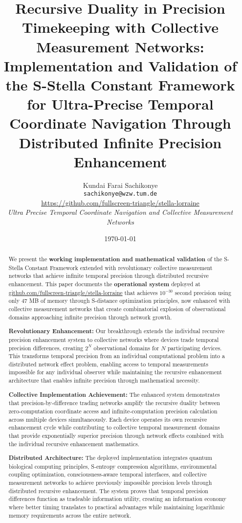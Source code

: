 \documentclass[12pt,a4paper]{article}
\title{Recursive Duality in Precision Timekeeping with Collective Measurement Networks: \\Implementation and Validation of the S-Stella Constant Framework \\for Ultra-Precise Temporal Coordinate Navigation Through \\Distributed Infinite Precision Enhancement}
\author{Kundai Farai Sachikonye\\
\texttt{sachikonye@wzw.tum.de}\\
\href{https://github.com/fullscreen-triangle/stella-lorraine}{https://github.com/fullscreen-triangle/stella-lorraine}\\
\textit{Ultra Precise Temporal Coordinate Navigation and Collective Measurement Networks}}
\date{\today}
\begin{document}
\maketitle

\begin{abstract}
We present the \textbf{working implementation and mathematical validation} of the S-Stella Constant Framework extended with revolutionary collective measurement networks that achieve infinite temporal precision through distributed recursive enhancement. This paper documents the \textbf{operational system} deployed at \href{https://github.com/fullscreen-triangle/stella-lorraine}{github.com/fullscreen-triangle/stella-lorraine} that achieves $10^{-30}$ second precision using only 47 MB of memory through S-distance optimization principles, now enhanced with collective measurement networks that create combinatorial explosion of observational domains approaching infinite precision through network growth.

\textbf{Revolutionary Enhancement:} Our breakthrough extends the individual recursive precision enhancement system to collective networks where devices trade temporal precision differences, creating $2^N$ observational domains for $N$ participating devices. This transforms temporal precision from an individual computational problem into a distributed network effect problem, enabling access to temporal measurements impossible for any individual observer while maintaining the recursive enhancement architecture that enables infinite precision through mathematical necessity.

\textbf{Collective Implementation Achievement:} The enhanced system demonstrates that precision-by-difference trading networks amplify the recursive duality between zero-computation coordinate access and infinite-computation precision calculation across multiple devices simultaneously. Each device operates its own recursive enhancement cycle while contributing to collective temporal measurement domains that provide exponentially superior precision through network effects combined with the individual recursive enhancement mathematics.

\textbf{Distributed Architecture:} The deployed implementation integrates quantum biological computing principles, S-entropy compression algorithms, environmental coupling optimization, consciousness-aware temporal interfaces, and collective measurement networks to achieve previously impossible precision levels through distributed recursive enhancement. The system proves that temporal precision differences function as tradeable information utility, creating an information economy where better timing translates to practical advantages while maintaining logarithmic memory requirements across the entire network.


\end{abstract}
\end{document}
